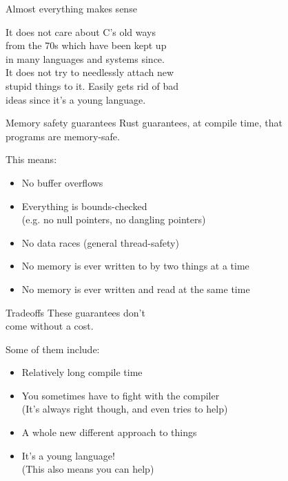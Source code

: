 \documentclass[usenames,dvipsnames,10pt,aspectratio=169]{beamer}
\begin{document}
\begin{frame}{Almost everything makes sense} 

\large
It does not care about C’s old ways\\ 
from the 70s which have been kept up \\
in many languages and systems since.\\ 

\vspace{0.3cm}
It does not try to needlessly attach new\\ 
stupid things to it. Easily gets rid of bad\\ 
ideas since it’s a young language.\\
\end{frame}

\begin{frame}{Memory safety guarantees}
\large
Rust guarantees, at compile time, that\\
programs are memory-safe.\\

\vspace{0.3cm}

This means:
\begin{itemize}
	\item No buffer overflows
	\item Everything is bounds-checked\\ (e.g. no null pointers, no dangling pointers)
	\item No data races (general thread-safety)
	\item No memory is ever written to by two things at a time
	\item No memory is ever written and read at the same time
\end{itemize}
\end{frame}

\begin{frame}{Tradeoffs}
\large
These guarantees don't\\
come without a cost.

\vspace{0.3cm}

Some of them include:
\begin{itemize}
	\item Relatively long compile time
	\item You sometimes have to fight with the compiler\\
		(It's always right though, and even tries to help)
	\item A whole new different approach to things
	\item It's a young language!\\
		(This also means you can help)
\end{itemize}
\end{frame}
\end{document}
